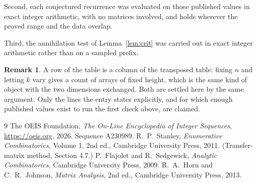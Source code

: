 \documentclass[11pt,a4paper]{article}
\theoremstyle{plain}
\theoremstyle{definition}
\newtheorem{remark}[theorem]{Remark}
\begin{document}
Second, each conjectured recurrence was evaluated on those published values in exact
integer arithmetic, with no matrices involved, and holds wherever the proved range and the
data overlap.

Third, the annihilation test of Lemma~\ref{lem:crit} was carried out in exact integer
arithmetic rather than on a sampled prefix.

\begin{remark}
A row of the table is a column of the transposed table: fixing $n$ and letting $k$ vary gives a
count of arrays of fixed height, which is the same kind of object with the two dimensions
exchanged. Both are settled here by the same argument. Only the lines the entry states
explicitly, and for which enough published values exist to run the first check above, are
claimed.
\end{remark}

\begin{thebibliography}{9}
 The OEIS Foundation, \emph{The On-Line Encyclopedia of Integer
Sequences}, \url{https://oeis.org}, 2026. Sequence A230989.
 R.~P.~Stanley, \emph{Enumerative Combinatorics}, Volume 1, 2nd ed.,
Cambridge University Press, 2011. (Transfer-matrix method, Section 4.7.)
 P.~Flajolet and R.~Sedgewick, \emph{Analytic Combinatorics}, Cambridge
University Press, 2009.
 R.~A.~Horn and C.~R.~Johnson, \emph{Matrix Analysis}, 2nd ed., Cambridge
University Press, 2013.
\end{thebibliography}
\end{document}
